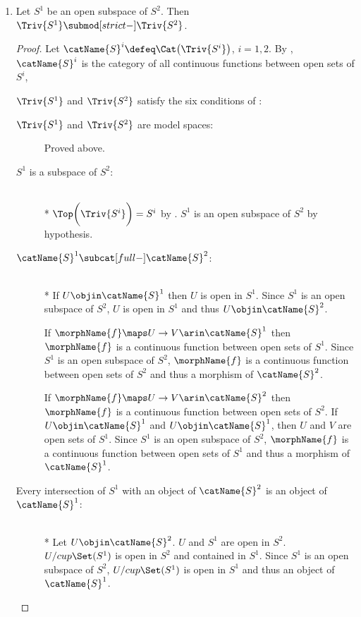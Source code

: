 \documentclass{article}
\begin{document}
\begin{lemma}
\begin{enumerate}
\item
Let $S^1$ be an open subspace of $S^2$. Then
$\Triv{S^1} \submod[strict-] \Triv{S^2}$.

\begin{proof}
Let $\catName{S}^i \defeq \Cat \bigl ( \Triv{S^i} \bigr )$, $i=1,2$.
By , $\catName{S}^i$ is the category of all
continuous functions between open sets of $S^i$,

$\Triv{S^1}$ and $\Triv{S^2}$ satisfy the six conditions of
:

\begin{description}
\item[$\Triv{S^1}$ and $\Triv{S^2}$ are model spaces:]
Proved above.

\item[$S^1$ is a subspace of $S^2$:]
\leavevmode \\*
$\Top \biggl ( \Triv{S^i} \biggr )= S^i$ by .
$S^1$ is an open subspace of $S^2$ by hypothesis.

\item[\ensuremath{\catName{S}^1 \subcat[full-] \catName{S}^2}:]
\leavevmode \\*
If $U \objin \catName{S}^1$ then $U$ is open in $S^1$. Since $S^1$ is
an open subspace of $S^2$, $U$ is open in $S^1$ and thus
$U \objin \catName{S}^2$.

If $\morphName{f} \maps U \to V \arin \catName{S}^1$ then $\morphName{f}$
is a continuous function between open sets of $S^1$. Since $S^1$ is an
open subspace of $S^2$, $\morphName{f}$ is a continuous function between
open sets of $S^2$ and thus a morphism of $\catName{S}^2$.

If $\morphName{f} \maps U \to V \arin \catName{S}^2$ then $\morphName{f}$
is a continuous function between open sets of $S^2$. If
$U \objin \catName{S}^1$ and $U \objin \catName{S}^1$, then $U$ and
$V$ are open sets of $S^1$. Since $S^1$ is an open subspace of $S^2$,
$\morphName{f}$ is a continuous function between open sets of $S^1$ and
thus a morphism of $\catName{S}^1$.

\item[Every intersection of $S^1$ with an object of $\catName{S}^2$ is an object of $\catName{S}^1$:]
\leavevmode \\*
Let $U \objin \catName{S}^2$. $U$ and $S^1$
are open in $S^2$. $U /cup \Set(S^1)$ is open in $S^2$ and contained in
$S^1$. Since $S^1$ is an open subspace of $S^2$, $U /cup \Set(S^1)$ is
open in $S^1$ and thus an object of $\catName{S}^1$.


\end{description}
\end{proof}
\end{enumerate}
\end{lemma}
\end{document}
